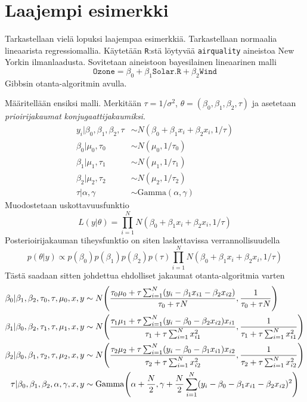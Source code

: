 \chapter{Laajempi esimerkki}\label{esimerkki}

Tarkastellaan vielä lopuksi laajempaa esimerkkiä. Tarkastellaan normaalia lineaarista regressiomallia. Käytetään \texttt{R}:stä löytyvää \texttt{airquality} aineistoa New Yorkin ilmanlaadusta. Sovitetaan aineistoon bayesilainen lineaarinen malli
\begin{equation}
	\texttt{Ozone} = \beta_0 + \beta_1\texttt{Solar.R} + \beta_2\texttt{Wind}
\end{equation}
 Gibbsin otanta-algoritmin avulla. 

Määritellään ensiksi malli. Merkitään $\tau = 1/\sigma^2$, $\theta = (\beta_0,\beta_1,\beta_2,\tau)$ ja asetetaan \emph{prioirijakaumat} \emph{konjugaattijakaumiksi}.
\begin{equation}
\begin{split}
	y_i|\beta_0,\beta_1,\beta_2,\tau &\sim N(\beta_0+\beta_1 x_i+\beta_2x_i, 1/\tau) \\
	\beta_0|\mu_0,\tau_0 &\sim N(\mu_0, 1/\tau_0) \\
	\beta_1|\mu_1,\tau_1 &\sim N(\mu_1, 1/\tau_1) \\
	\beta_2|\mu_2,\tau_2 &\sim N(\mu_2, 1/\tau_2) \\
	\tau|\alpha, \gamma &\sim \mathrm{Gamma}(\alpha, \gamma)
\end{split}	
\end{equation}
Muodostetaan uskottavuusfunktio
\begin{equation}
	L(y|\theta) = \prod_{i=1}^{N} N(\beta_0+\beta_1 x_i+\beta_2x_i, 1/\tau)
\end{equation}
Posterioirijakauman tiheysfunktio on siten laskettavissa verrannollisuudella
\begin{equation}
	p(\theta|y) \propto p(\beta_0)p(\beta_1)p(\beta_2)p(\tau)\prod_{i=1}^{N} N(\beta_0+\beta_1 x_i+\beta_2x_i, 1/\tau)
\end{equation}
Tästä saadaan sitten johdettua ehdolliset jakaumat otanta-algoritmia varten
\begin{equation}\label{marginaalit}
\begin{split}
	\beta_0 | \beta_1,\beta_2,\tau_0,\tau,\mu_0,x,y &\sim 
	N\pqty{\frac{\tau_0\mu_0+\tau\sum_{i=1}^{N}(y_i-\beta_1x_{i1}-\beta_2x_{i2})}{\tau_0+\tau N}, \frac{1}{\tau_0+\tau N}} \\
	\beta_1 | \beta_0,\beta_2,\tau_1,\tau,\mu_1,x,y &\sim 
	N\pqty{\frac{\tau_1\mu_1+\tau\sum_{i=1}^{N}(y_i-\beta_0-\beta_2x_{i2})x_{i1}}{\tau_1+\tau\sum_{i=1}^{N}x_{i1}^2}, \frac{1}{\tau_1+\tau\sum_{i=1}^{N}x_{i1}^2}}\\
	\beta_2 | \beta_0,\beta_1,\tau_2,\tau,\mu_2,x,y &\sim 
	N\pqty{\frac{\tau_2\mu_2+\tau\sum_{i=1}^{N}(y_i-\beta_0-\beta_1x_{i1})x_{i2}}{\tau_2+\tau\sum_{i=1}^{N}x_{i2}^2}, \frac{1}{\tau_2+\tau\sum_{i=1}^{N}x_{i2}^2}}\\
	\tau | \beta_0,\beta_1,\beta_2,\alpha,\gamma,x,y &\sim 
	\mathrm{Gamma}\pqty{\alpha+\frac{N}{2},\gamma + \frac{N}{2}\sum_{i=1}^{N}(y_i-\beta_0-\beta_1x_{i1}-\beta_2x_{i2})^2}
\end{split}
\end{equation}
